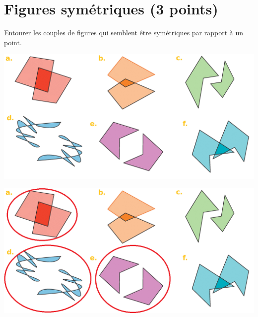 \section{Figures symétriques (3 points)}

\begin{questions}
	\question[3] Entourer les couples de figures qui semblent être symétriques par rapport à un point.
	
	\begin{center}
		\includegraphics[scale=0.4]{img/figures}
	\end{center} 

	\begin{solution}
		\begin{center}
			\includegraphics[scale=0.4]{img/figures_corr}
		\end{center} 
	\end{solution}
\end{questions}


